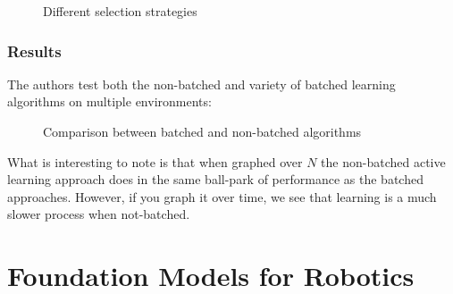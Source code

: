 \documentclass[
  letterpaper,
  numbers=noenddot,
  DIV=11,
  oneside]{scrreprt}
\theoremstyle{remark}
\begin{document}
\begin{figure}


\caption{\label{fig-selection-strategy}Different selection strategies}

\end{figure}%

\subsubsection{Results}\label{results}

The authors test both the non-batched and variety of batched learning
algorithms on multiple environments:

\begin{figure}


\caption{\label{fig-batch-nonbatch}Comparison between batched and
non-batched algorithms}

\end{figure}%

What is interesting to note is that when graphed over \(N\) the
non-batched active learning approach does in the same ball-park of
performance as the batched approaches. However, if you graph it over
time, we see that learning is a much slower process when not-batched.

\section{Foundation Models for
Robotics}\label{foundation-models-for-robotics}
\end{document}
